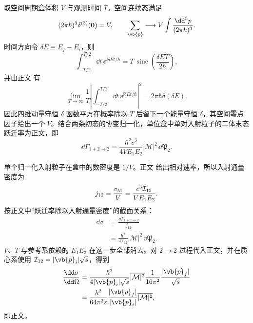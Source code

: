 \begin{derivation}[盒归一化怎样给出二体散射截面]

取空间周期盒体积 $V$ 与观测时间 $T$。空间连续态满足
\begin{equation*}
 (2\pi\hbar)^3\delta^{(3)}(\mathbf0)=V,
 \qquad
 \sum_{\vb{p}}\longrightarrow
 V\int\frac{\dd^3 p}{(2\pi\hbar)^3}.
\end{equation*}
时间方向令 $\delta E\equiv E_f-E_i$，则
\begin{equation*}
 \int_{-T/2}^{T/2}\dd t\,\ee^{\ii\delta E t/\hbar}
 =T\,\operatorname{sinc}\!\left(\frac{\delta E T}{2\hbar}\right),
\end{equation*}
并由正文 有
\begin{equation*}
 \lim_{T\to\infty}\frac1T
 \left|\int_{-T/2}^{T/2}\dd t\,\ee^{\ii\delta E t/\hbar}\right|^2
 =2\pi\hbar\delta(\delta E).
\end{equation*}
因此四维动量守恒 $\delta$ 函数平方在概率除以 $T$ 后留下一个能量守恒 $\delta$，其空间零点因子给出一个 $V$。结合两条初态的协变归一化，单位盒中单对入射粒子的二体末态跃迁率为正文，即
\begin{equation*}
 \dd\Gamma_{1+2\to2}
 =\frac{\hbar^2c^3}{4VE_1E_2}
 \overline{|\mathcal M|^2}\,\dd\mathfrak P_2.
\end{equation*}

单个归一化入射粒子在盒中的数密度是 $1/V$。正文 给出相对速率，所以入射通量密度为
\begin{equation*}
 j_{12}=\frac{v_{\rm M}}{V}
 =\frac{c^3\mathcal I_{12}}{VE_1E_2}.
\end{equation*}
按正文中“跃迁率除以入射通量密度”的截面关系：
\begin{align*}
 \dd\sigma
 &=\frac{\dd\Gamma_{1+2\to2}}{j_{12}}\\
 &=\frac{\hbar^2}{4\mathcal I_{12}}
 \overline{|\mathcal M|^2}\,\dd\mathfrak P_2.
\end{align*}
$V$、$T$ 与参考系依赖的 $E_1E_2$ 在这一步全部消去。对 $2\to2$ 过程代入正文，并在质心系使用
$\mathcal I_{12}=|\vb{p}_i|\sqrt s$，得到
\begin{align*}
 \frac{\dd\sigma}{\dd\Omega}
 &=\frac{\hbar^2}{4|\vb{p}_i|\sqrt s}
 \overline{|\mathcal M|^2}
 \frac1{16\pi^2}\frac{|\vb{p}_f|}{\sqrt s}\\
 &=\frac{\hbar^2}{64\pi^2s}
 \frac{|\vb{p}_f|}{|\vb{p}_i|}
 \overline{|\mathcal M|^2},
\end{align*}
即正文。
\end{derivation}

